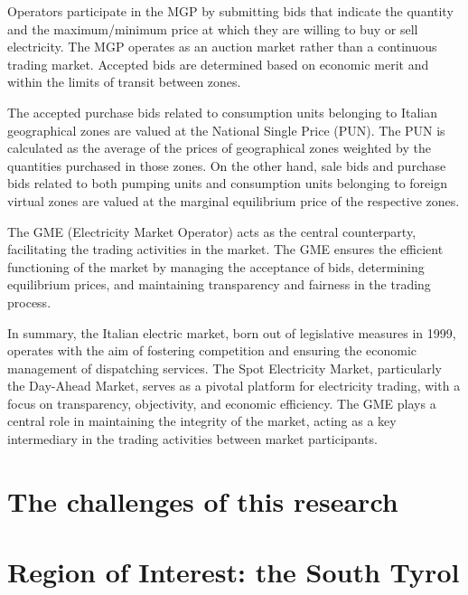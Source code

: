 Operators participate in the MGP by submitting bids that indicate the quantity and the maximum/minimum price at which they are willing to buy or sell electricity. The MGP operates as an auction market rather than a continuous trading market. Accepted bids are determined based on economic merit and within the limits of transit between zones.

The accepted purchase bids related to consumption units belonging to Italian geographical zones are valued at the National Single Price (PUN). The PUN is calculated as the average of the prices of geographical zones weighted by the quantities purchased in those zones. On the other hand, sale bids and purchase bids related to both pumping units and consumption units belonging to foreign virtual zones are valued at the marginal equilibrium price of the respective zones.

The GME (Electricity Market Operator) acts as the central counterparty, facilitating the trading activities in the market. The GME ensures the efficient functioning of the market by managing the acceptance of bids, determining equilibrium prices, and maintaining transparency and fairness in the trading process.

In summary, the Italian electric market, born out of legislative measures in 1999, operates with the aim of fostering competition and ensuring the economic management of dispatching services. The Spot Electricity Market, particularly the Day-Ahead Market, serves as a pivotal platform for electricity trading, with a focus on transparency, objectivity, and economic efficiency. The GME plays a central role in maintaining the integrity of the market, acting as a key intermediary in the trading activities between market participants.

\section{The challenges of this research\label{section1.3}}

\section{Region of Interest: the South Tyrol\label{section1.4}}

